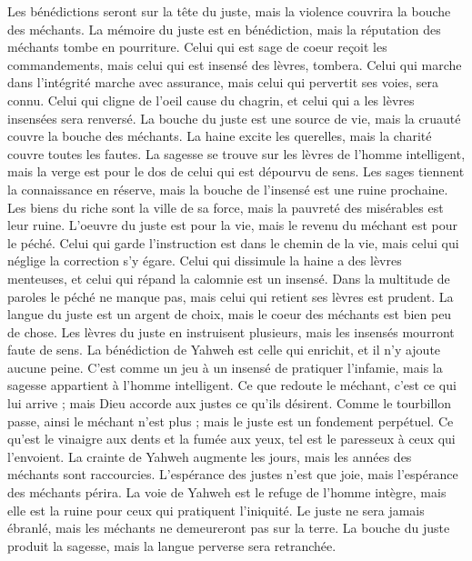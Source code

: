 \begin{multicols}{2}
Les bénédictions seront sur la tête du juste, mais la violence couvrira la bouche des méchants.
La mémoire du juste est en bénédiction, mais la réputation des méchants tombe en pourriture.
Celui qui est sage de coeur reçoit les commandements, mais celui qui est insensé des lèvres, tombera.
Celui qui marche dans l'intégrité marche avec assurance, mais celui qui pervertit ses voies, sera connu.
Celui qui cligne de l'oeil cause du chagrin, et celui qui a les lèvres insensées sera renversé.
La bouche du juste est une source de vie, mais la cruauté couvre la bouche des méchants.
La haine excite les querelles, mais la charité couvre toutes les fautes.
La sagesse se trouve sur les lèvres de l'homme intelligent, mais la verge est pour le dos de celui qui est dépourvu de sens.
Les sages tiennent la connaissance en réserve, mais la bouche de l'insensé est une ruine prochaine.
Les biens du riche sont la ville de sa force, mais la pauvreté des misérables est leur ruine.
L'oeuvre du juste est pour la vie, mais le revenu du méchant est pour le péché.
Celui qui garde l'instruction est dans le chemin de la vie, mais celui qui néglige la correction s'y égare.
Celui qui dissimule la haine a des lèvres menteuses, et celui qui répand la calomnie est un insensé.
Dans la multitude de paroles le péché ne manque pas, mais celui qui retient ses lèvres est prudent.
La langue du juste est un argent de choix, mais le coeur des méchants est bien peu de chose.
Les lèvres du juste en instruisent plusieurs, mais les insensés mourront faute de sens.
La bénédiction de Yahweh est celle qui enrichit, et il n'y ajoute aucune peine.
C'est comme un jeu à un insensé de pratiquer l'infamie, mais la sagesse appartient à l'homme intelligent.
Ce que redoute le méchant, c'est ce qui lui arrive ; mais Dieu accorde aux justes ce qu'ils désirent.
Comme le tourbillon passe, ainsi le méchant n'est plus ; mais le juste est un fondement perpétuel.
Ce qu'est le vinaigre aux dents et la fumée aux yeux, tel est le paresseux à ceux qui l'envoient.
La crainte de Yahweh augmente les jours, mais les années des méchants sont raccourcies.
L'espérance des justes n'est que joie, mais l'espérance des méchants périra.
La voie de Yahweh est le refuge de l'homme intègre, mais elle est la ruine pour ceux qui pratiquent l'iniquité.
Le juste ne sera jamais ébranlé, mais les méchants ne demeureront pas sur la terre.
La bouche du juste produit la sagesse, mais la langue perverse sera retranchée.

\end{multicols}
